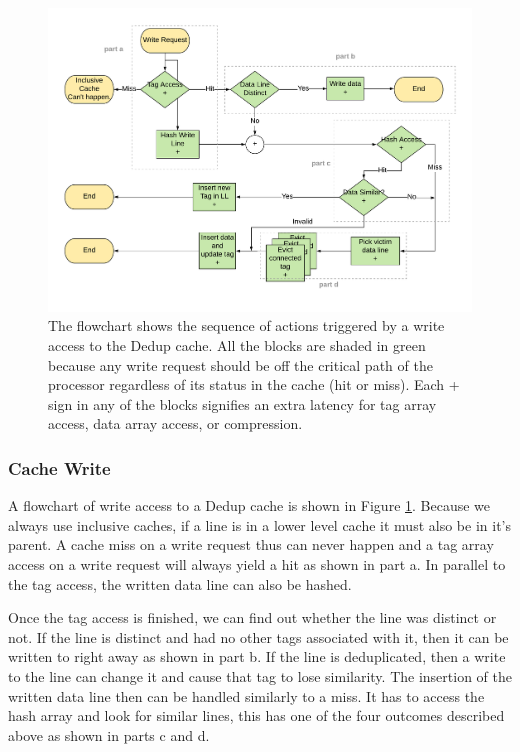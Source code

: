 \begin{figure}[h]
    \includegraphics[width=\textwidth]{Dedup_Write.pdf}
    \caption[Dedup Write]{The flowchart shows the sequence of actions triggered by a write access to the Dedup cache. All the blocks are shaded in green because any write request should be off the critical path of the processor regardless of its status in the cache (hit or miss). Each + sign in any of the blocks signifies an extra latency for tag array access, data array access, or compression.}
    \label{fig:Dedup_Write}
\end{figure}
\subsubsection{Cache Write}
A flowchart of write access to a Dedup cache is shown in Figure \ref{fig:Dedup_Write}. Because we always use inclusive caches, if a line is in a lower level cache it must also be in it's parent. A cache miss on a write request thus can never happen and a tag array access on a write request will always yield a hit as shown in part a. In parallel to the tag access, the written data line can also be hashed.\par
Once the tag access is finished, we can find out whether the line was distinct or not. If the line is distinct and had no other tags associated with it, then it can be written to right away as shown in part b. If the line is deduplicated, then a write to the line can change it and cause that tag to lose similarity. The insertion of the written data line then can be handled similarly to a miss. It has to access the hash array and look for similar lines, this has one of the four outcomes described above as shown in parts c and d.

